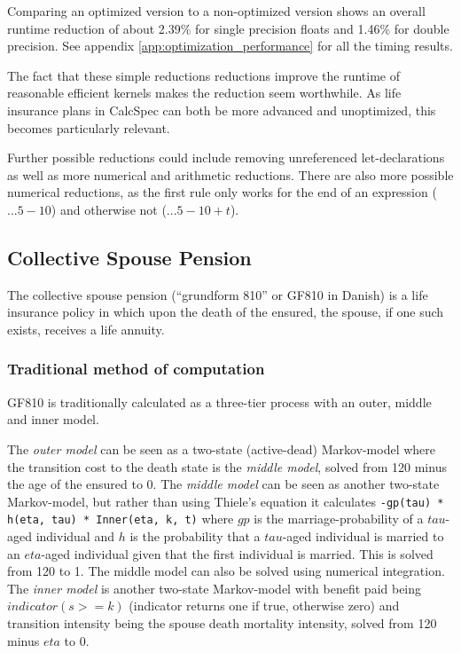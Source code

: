 Comparing an optimized version to a non-optimized version shows an overall runtime reduction of about 2.39\% for single precision floats and 1.46\% for double precision.
See appendix \ref{app:optimization_performance} for all the timing results.

The fact that these simple reductions reductions improve the runtime of reasonable efficient kernels makes the reduction seem worthwhile.
As life insurance plans in CalcSpec can both be more advanced and unoptimized, this becomes particularly relevant.

Further possible reductions could include removing unreferenced let-declarations as well as more numerical and arithmetic reductions.
There are also more possible numerical reductions, as the first rule only works for the end of an expression ($... 5 - 10$) and otherwise not ($... 5 - 10 + t$).

\subsection{Collective Spouse Pension}\label{sub:gf810}
The collective spouse pension (``grundform 810'' or GF810 in Danish) is a life insurance policy in which upon the death of the ensured, the spouse, if one such exists, receives a life annuity.

\subsubsection{Traditional method of computation}
GF810 is traditionally calculated as a three-tier process with an outer, middle and inner model.

The \emph{outer model} can be seen as a two-state (active-dead) Markov-model where the transition cost to the death state is the \emph{middle model}, solved from 120 minus the age of the ensured to 0.
The \emph{middle model} can be seen as another two-state Markov-model, but rather than using Thiele's equation it calculates \lstinline$-gp(tau) * h(eta, tau) * Inner(eta, k, t)$ where $gp$ is the marriage-probability of a $tau$-aged individual and $h$ is the probability that a $tau$-aged individual is married to an $eta$-aged individual given that the first individual is married.
This is solved from 120 to 1. The middle model can also be solved using numerical integration.
The \emph{inner model} is another two-state Markov-model with benefit paid being $indicator(s >= k)$ (indicator returns one if true, otherwise zero) and transition intensity being the spouse death mortality intensity, solved from 120 minus $eta$ to 0.

